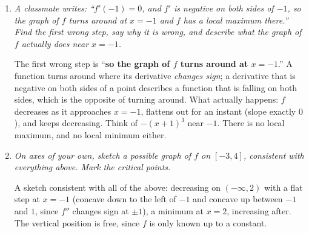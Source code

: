 \documentclass[11pt]{article}
\newcommand{\gridxy}[4]{%
  \foreach \gX in {#1,...,#2} \draw[gray!25] (\gX,#3) -- (\gX,#4);
  \foreach \gY in {#3,...,#4} \draw[gray!25] (#1,\gY) -- (#2,\gY);}
\newcommand{\q}[1]{{\color{gray!55!black}\itshape #1}\par\smallskip}
\begin{document}
\begin{enumerate}
\item \q{A classmate writes: ``$f'(-1)=0$, and $f'$ is negative on both sides of $-1$, so the graph of $f$ turns around at $x=-1$ and $f$ has a local maximum there.'' Find the first wrong step, say why it is wrong, and describe what the graph of $f$ actually does near $x=-1$.}
The first wrong step is ``\textbf{so the graph of $f$ turns around at $x=-1$}.''
A function turns around where its derivative \emph{changes sign}; a derivative that is
negative on both sides of a point describes a function that is falling on both sides, which
is the opposite of turning around. What actually happens: $f$ decreases as it approaches
$x=-1$, flattens out for an instant (slope exactly $0$), and keeps decreasing. Think of
$-(x+1)^3$ near $-1$. There is no local maximum, and no local minimum either.

\item \q{On axes of your own, sketch a possible graph of $f$ on $[-3,4]$, consistent with everything above. Mark the critical points.}
A sketch consistent with all of the above: decreasing on $(-\infty,2)$ with a flat
step at $x=-1$ (concave down to the left of $-1$ and concave up between $-1$ and $1$,
since $f''$ changes sign at $\pm1$), a minimum at $x=2$, increasing after. The vertical
position is free, since $f$ is only known up to a constant.

\smallskip
\begin{center}
\end{center}
\end{enumerate}
\end{document}
